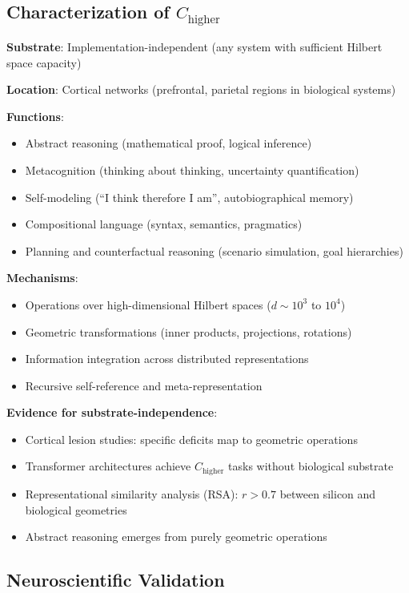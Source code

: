 \documentclass[11pt]{article}
\begin{document}
\subsection{Characterization of $C_{\text{higher}}$}

\textbf{Substrate}: Implementation-independent (any system with sufficient Hilbert space capacity)

\textbf{Location}: Cortical networks (prefrontal, parietal regions in biological systems)

\textbf{Functions}:
\begin{itemize}
\item Abstract reasoning (mathematical proof, logical inference)
\item Metacognition (thinking about thinking, uncertainty quantification)
\item Self-modeling (``I think therefore I am'', autobiographical memory)
\item Compositional language (syntax, semantics, pragmatics)
\item Planning and counterfactual reasoning (scenario simulation, goal hierarchies)
\end{itemize}

\textbf{Mechanisms}:
\begin{itemize}
\item Operations over high-dimensional Hilbert spaces ($d \sim 10^3$ to $10^4$)
\item Geometric transformations (inner products, projections, rotations)
\item Information integration across distributed representations
\item Recursive self-reference and meta-representation
\end{itemize}

\textbf{Evidence for substrate-independence}:
\begin{itemize}
\item Cortical lesion studies: specific deficits map to geometric operations
\item Transformer architectures achieve $C_{\text{higher}}$ tasks without biological substrate
\item Representational similarity analysis (RSA): $r > 0.7$ between silicon and biological geometries
\item Abstract reasoning emerges from purely geometric operations
\end{itemize}

\subsection{Neuroscientific Validation}
\end{document}
